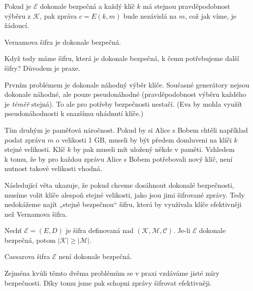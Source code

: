 \documentclass[
  program=infoi,
  biblatex=false,
  figures=true,
  glossaries,
  tables=false,
  sourcecodes=true,
  index
]{kidiplom}
\begin{document}
        Pokud je $\mathcal{E}$ dokonale bezpečná a každý klíč $k$ má stejnou pravděpodobnost výběru z $\mathcal{K}$, pak
        zpráva $c = E(k, m)$ bude nezávislá na $m$, což jak víme, je žádoucí.

        \begin{theorem}
            Vernamova šifra je dokonale bezpečná.
        \end{theorem}

        \medskip
        
        Když tedy máme šifru, která je dokonale bezpečná, k čemu potřebujeme další šifry?
        Důvodem je praxe.

        Prvním problémem je dokonale náhodný výběr klíče.
        Současné generátory nejsou dokonale náhodné, ale pouze pseudonáhodné (pravděpodobnost výběru každého je \emph{téměř} stejná).
        To ale pro potřeby bezpečnosti nestačí.
        (Eva by mohla využít pseudonáhodnosti k snazšímu uhádnutí klíče.)

        Tím druhým je paměťová náročnost.
        Pokud by si Alice s Bobem chtěli například poslat zprávu $m$ o velikosti 1 GB, museli by být předem
        domluveni na klíči $k$ stejné velikosti.
        Klíč $k$ by pak museli mít uložený někde v paměti.
        Vzhledem \\ k tomu, že by pro každou zprávu Alice s Bobem potřebovali nový klíč,
        není nutnost takové velikosti vhodná.

        Následující věta ukazuje, že pokud chceme dosáhnout dokonalé bezpečnosti, musíme volit klíče alespoň stejné
        velikosti, jako jsou jimi šifrované zprávy. Tedy nedokážeme najít „stejně bezpečnou“ šifru, která by
        využívala klíče efektivněji než Vernamova šifra.

        \begin{theorem}
            
            Nechť $\mathcal{E}  = (E, D)$ je šifra definovaná nad $(\mathcal{K},\mathcal{M},\mathcal{C})$.
            Je-li $\mathcal{E}$ dokonale bezpečná, potom $|\mathcal{K}| \geq |\mathcal{M}|$.
        \end{theorem}

        \begin{consequence}
            Caesarova šifra $\mathcal{E}$ není dokonale bezpečná.
        \end{consequence}

        Zejména kvůli těmto dvěma problémům se v praxi vzdáváme jisté míry bezpečnosti.
        Díky tomu jsme pak schopni zprávy šifrovat efektivněji.
\end{document}
